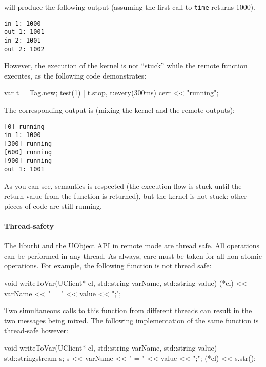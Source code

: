 \noindent
will produce the following output (assuming the first call to
\lstinline|time| returns 1000).

\begin{verbatim}
in 1: 1000
out 1: 1001
in 2: 1001
out 2: 1002
\end{verbatim}

However, the execution of the \urbi kernel is not ``stuck'' while the
remote function executes, as the following code demonstrates:

\begin{urbiunchecked}
var t = Tag.new;
test(1) | t.stop,
t:every(300ms)
  cerr << "running";
\end{urbiunchecked}

The corresponding output is (mixing the kernel and the remote outputs):

\begin{verbatim}
[0] running
in 1: 1000
[300] running
[600] running
[900] running
out 1: 1001
\end{verbatim}

As you can see, \urbi semantics is respected (the execution flow is
stuck until the return value from the function is returned), but the
kernel is not stuck: other pieces of code are still running.

\paragraph{Thread-safety}

The liburbi and the UObject API in remote mode are thread safe. All
operations can be performed in any thread. As always, care must be
taken for all non-atomic operations. For example, the following
function is not thread safe:

\begin{cxx}
void
writeToVar(UClient* cl, std::string varName, std::string value)
{
  (*cl) << varName << " = " << value << ";";
}
\end{cxx}

Two simultaneous calls to this function from different threads can
result in the two messages being mixed.  The following implementation
of the same function is thread-safe however:

\begin{cxx}
void
writeToVar(UClient* cl, std::string varName, std::string value)
{
  std::stringstream s;
  s << varName << " = " << value << ";";
  (*cl) << s.str();
}
\end{cxx}

